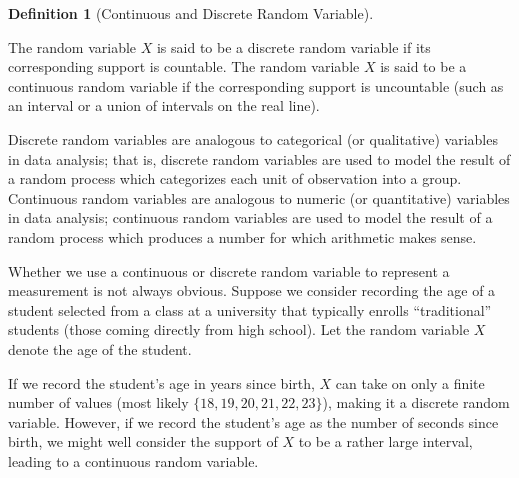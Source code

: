 \documentclass[
  letterpaper,
  DIV=11,
  numbers=noendperiod]{scrreprt}
\theoremstyle{plain}
\theoremstyle{definition}
\newtheorem{definition}{Definition}[chapter]
\theoremstyle{definition}
\theoremstyle{remark}
\begin{document}
\begin{definition}[Continuous and Discrete Random
Variable]\protect\hypertarget{def-rvtypes}{}\label{def-rvtypes}

The random variable \(X\) is said to be a discrete random variable if
its corresponding support is countable. The random variable \(X\) is
said to be a continuous random variable if the corresponding support is
uncountable (such as an interval or a union of intervals on the real
line).

\end{definition}

Discrete random variables are analogous to categorical (or qualitative)
variables in data analysis; that is, discrete random variables are used
to model the result of a random process which categorizes each unit of
observation into a group. Continuous random variables are analogous to
numeric (or quantitative) variables in data analysis; continuous random
variables are used to model the result of a random process which
produces a number for which arithmetic makes sense.

\begin{tcolorbox}[enhanced jigsaw, toprule=.15mm, left=2mm, title=\textcolor{quarto-callout-warning-color}{\faExclamationTriangle}\hspace{0.5em}{Warning}, opacityback=0, toptitle=1mm, leftrule=.75mm, colbacktitle=quarto-callout-warning-color!10!white, opacitybacktitle=0.6, titlerule=0mm, breakable, colframe=quarto-callout-warning-color-frame, arc=.35mm, coltitle=black, bottomtitle=1mm, rightrule=.15mm, colback=white, bottomrule=.15mm]

Whether we use a continuous or discrete random variable to represent a
measurement is not always obvious. Suppose we consider recording the age
of a student selected from a class at a university that typically
enrolls ``traditional'' students (those coming directly from high
school). Let the random variable \(X\) denote the age of the student.

If we record the student's age in years since birth, \(X\) can take on
only a finite number of values (most likely
\(\{18, 19, 20, 21, 22, 23\}\)), making it a discrete random variable.
However, if we record the student's age as the number of seconds since
birth, we might well consider the support of \(X\) to be a rather large
interval, leading to a continuous random variable.

\end{tcolorbox}
\end{document}
